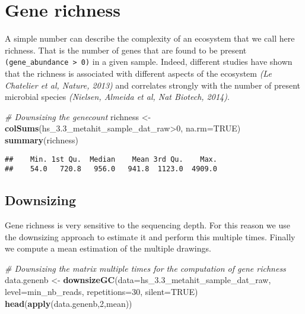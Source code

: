 \documentclass[]{article}
\newenvironment{Shaded}{\begin{snugshade}}{\end{snugshade}}
\newcommand{\KeywordTok}[1]{\textcolor[rgb]{0.13,0.29,0.53}{\textbf{{#1}}}}
\newcommand{\DataTypeTok}[1]{\textcolor[rgb]{0.13,0.29,0.53}{{#1}}}
\newcommand{\DecValTok}[1]{\textcolor[rgb]{0.00,0.00,0.81}{{#1}}}
\newcommand{\StringTok}[1]{\textcolor[rgb]{0.31,0.60,0.02}{{#1}}}
\newcommand{\CommentTok}[1]{\textcolor[rgb]{0.56,0.35,0.01}{\textit{{#1}}}}
\newcommand{\OtherTok}[1]{\textcolor[rgb]{0.56,0.35,0.01}{{#1}}}
\newcommand{\NormalTok}[1]{{#1}}
\begin{document}
\section{Gene richness}\label{gene-richness}

A simple number can describe the complexity of an ecosystem that we call
here richness. That is the number of genes that are found to be present
\texttt{(gene\_abundance\ \textgreater{}\ 0)} in a given sample. Indeed,
different studies have shown that the richness is associated with
different aspects of the ecosystem \emph{(Le Chatelier et al, Nature,
2013)} and correlates strongly with the number of present microbial
species \emph{(Nielsen, Almeida et al, Nat Biotech, 2014)}.

\begin{Shaded}
\begin{Highlighting}[]
\CommentTok{# Downsizing the genecount}
\NormalTok{richness <-}\StringTok{ }\KeywordTok{colSums}\NormalTok{(hs_3.3_metahit_sample_dat_raw>}\DecValTok{0}\NormalTok{, }\DataTypeTok{na.rm=}\OtherTok{TRUE}\NormalTok{)}
\KeywordTok{summary}\NormalTok{(richness)}
\end{Highlighting}
\end{Shaded}

\begin{verbatim}
##    Min. 1st Qu.  Median    Mean 3rd Qu.    Max. 
##    54.0   720.8   956.0   941.8  1123.0  4909.0
\end{verbatim}

\subsection{Downsizing}\label{downsizing-1}

Gene richness is very sensitive to the sequencing depth. For this reason
we use the downsizing approach to estimate it and perform this multiple
times. Finally we compute a mean estimation of the multiple drawings.

\begin{Shaded}
\begin{Highlighting}[]
\CommentTok{# Downsizing the matrix multiple times for the computation of gene richness}
\NormalTok{data.genenb <-}\StringTok{ }\KeywordTok{downsizeGC}\NormalTok{(}\DataTypeTok{data=}\NormalTok{hs_3.3_metahit_sample_dat_raw, }
                          \DataTypeTok{level=}\NormalTok{min_nb_reads, }\DataTypeTok{repetitions=}\DecValTok{30}\NormalTok{, }\DataTypeTok{silent=}\OtherTok{TRUE}\NormalTok{)}
\KeywordTok{head}\NormalTok{(}\KeywordTok{apply}\NormalTok{(data.genenb,}\DecValTok{2}\NormalTok{,mean))}
\end{Highlighting}
\end{Shaded}
\end{document}
